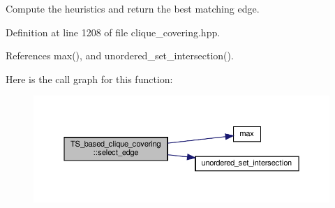 Compute the heuristics and return the best matching edge. 



Definition at line 1208 of file clique\+\_\+covering.\+hpp.



References max(), and unordered\+\_\+set\+\_\+intersection().

Here is the call graph for this function\+:
\nopagebreak
\begin{figure}[H]
\begin{center}
\leavevmode
\includegraphics[width=350pt]{d1/d29/classTS__based__clique__covering_a5a637fe39f725d7486e89fb3f773476f_cgraph}
\end{center}
\end{figure}
\mbox{\label{classTS__based__clique__covering_a72ac374b2e8dd3f983fdecff9eb65aa3}} 

